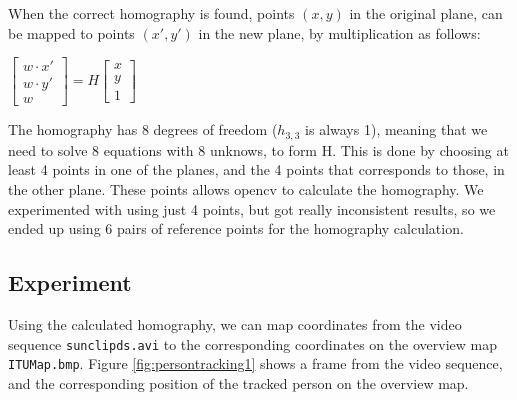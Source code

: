 \documentclass[a4paper,11pt]{article}
\begin{document}
When the correct homography is found, points $(x,y)$ in the original plane, can be mapped to points $(x',y')$ in the new plane, by multiplication as follows:

\begin{center}
$
\begin{bmatrix}
w\cdot x' \\
w\cdot y' \\
w
\end{bmatrix}
= H
\begin{bmatrix}
x \\
y \\
1
\end{bmatrix}
$
\end{center}

The homography has 8 degrees of freedom ($h_{3,3}$ is always 1), meaning that we need to solve 8 equations with 8 unknows, to form H. This is done by choosing at least 4 points in one of the planes, and the 4 points that corresponds to those, in the other plane. These points allows opencv to calculate the homography. We experimented with using just 4 points, but got really inconsistent results, so we ended up using 6 pairs of reference points for the homography calculation.

\subsection{Experiment}
Using the calculated homography, we can map coordinates from the video sequence \texttt{sunclipds.avi} to the corresponding coordinates on the overview map \texttt{ITUMap.bmp}. Figure \ref{fig:persontracking1} shows a frame from the video sequence, and the corresponding position of the tracked person on the overview map.
\end{document}
